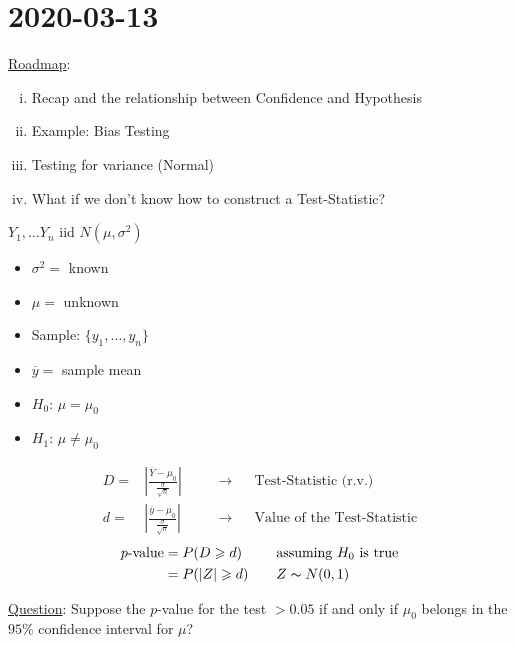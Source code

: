 \section{2020-03-13}
\underline{Roadmap}:
\begin{enumerate}[(i)]
    \item Recap and the relationship between Confidence and Hypothesis
    \item Example: Bias Testing
    \item Testing for variance (Normal)
    \item What if we don't know how to construct a Test-Statistic?
\end{enumerate}

\begin{exbox}
    \begin{example}
        $ Y_1,\ldots Y_n $ iid $ N(\mu,\sigma^2) $
        \begin{itemize}
            \item $ \sigma^2= $ known
            \item $ \mu= $ unknown
            \item Sample: $ \{y_1,\ldots ,y_n\} $
            \item $ \overline{y}= $ sample mean
            \item $ H_0 $: $ \mu=\mu_0 $
            \item $ H_1 $: $ \mu \neq \mu_0 $
        \end{itemize}
        \[
            \begin{aligned}
                D= & \left|\frac{\overline{Y}-\mu_0}{\frac{\sigma}{\sqrt{n}}} \right|
                   & \quad                                                            & \rightarrow &  & \text{Test-Statistic (r.v.)}       \\
                d= & \left|\frac{\overline{y}-\mu_0}{\frac{\sigma}{\sqrt{n}}} \right|
                   &                                                                  & \rightarrow &  & \text{Value of the Test-Statistic}
            \end{aligned}
        \]
        \[
            \begin{aligned}
                p\text{-value}
                 & =P(D\geqslant d)   & \quad & \text{assuming }H_0\text{ is true} \\
                 & =P(|Z|\geqslant d) &       & Z \thicksim N(0,1)
            \end{aligned}
        \]
    \end{example}
\end{exbox}
\underline{Question}: Suppose the $ p $-value for the test $ >0.05 $
if and only if $ \mu_0 $ belongs in the $ 95\% $ confidence interval for $ \mu $?

